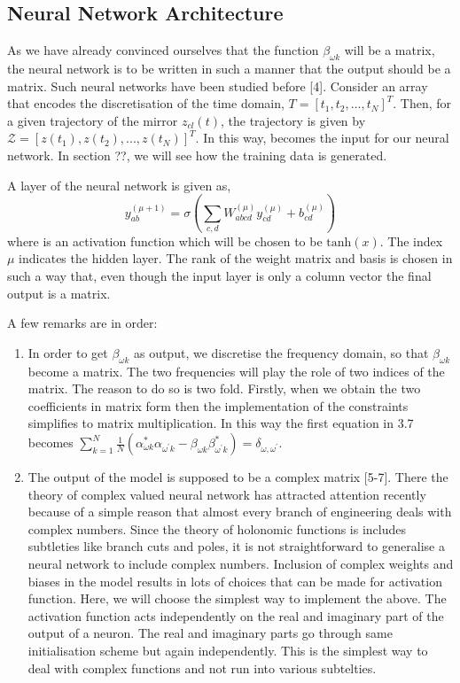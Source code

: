 \subsection{Neural Network Architecture}
As we have already convinced ourselves that the function $\beta_{\omega k}$ will be a matrix, the neural network is to be written in such a manner that the output should be a matrix. Such neural networks have been studied before [4]. Consider an array that encodes the discretisation of the time domain, $T=[t_{1},t_{2},...,t_{N}]^{T}$. Then, for a given trajectory of the mirror $z_{cl}(t)$, the trajectory is given by $\mathcal{Z}=[z(t_{1}),z(t_{2}),...,z(t_{N})]^{T}$. In this way, becomes the input for our neural network. In section ??, we will see how the training data is generated. 

A layer of the neural network is given as, 
\begin{equation}
y_{ab}^{(\mu+1)}=\sigma\left(\sum_{c,d}W_{abcd}^{(\mu)}y_{cd}^{(\mu)}+b_{cd}^{(\mu)}\right)
\end{equation}
where is an activation function which will be chosen to be $\text{tanh}(x)$. The index $\mu$ indicates the hidden layer. The rank of the weight matrix and basis is chosen in such a way that, even though the input layer is only a column vector the final output is a matrix. 

A few remarks are in order: 
\begin{enumerate}
    \item In order to get $\beta_{\omega k}$ as output, we discretise the frequency domain, so that $\beta_{\omega k}$ become a matrix. The two frequencies will play the role of two indices of the matrix. The reason to do so is two fold. Firstly, when we obtain the two coefficients in matrix form then the implementation of the constraints simplifies to matrix multiplication. In this way the first equation in 3.7 becomes $\sum_{k=1}^{N}\frac{1}{N}(\alpha_{\omega k}^{*}\alpha_{\omega^{\prime}k}-\beta_{\omega k}\beta_{\omega^{\prime}k}^{*})=\delta_{\omega,\omega^{\prime}}$.
    \item The output of the model is supposed to be a complex matrix [5-7]. There the theory of complex valued neural network has attracted attention recently because of a simple reason that almost every branch of engineering deals with complex numbers. Since the theory of holonomic functions is includes subtleties like branch cuts and poles, it is not straightforward to generalise a neural network to include complex numbers. Inclusion of complex weights and biases in the model results in lots of choices that can be made for activation function. Here, we will choose the simplest way to implement the above. The activation function acts independently on the real and imaginary part of the output of a neuron. The real and imaginary parts go through same initialisation scheme but again independently. This is the simplest way to deal with complex functions and not run into various subtelties. 
\end{enumerate}

